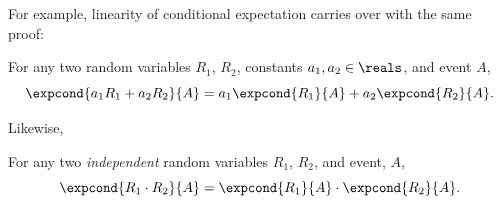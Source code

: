 For example, linearity of conditional expectation carries over
with the same proof:
\begin{theorem}\label{condexplin}
For any two random variables $R_1$, $R_2$, constants
$a_1,a_2\in\reals$, and event $A$, 
\[
\expcond{a_1R_1+a_2R_2}{A} = a_1\expcond{R_1}{A} + a_2\expcond{R_2}{A}.
\]
\end{theorem}

Likewise,
\begin{theorem}
For any two \emph{independent} random variables $R_1$, $R_2$, and event, $A$,
\[
\expcond{R_1 \cdot R_2}{A} = \expcond{R_1}{A} \cdot \expcond{R_2}{A}.
\]
\end{theorem}

